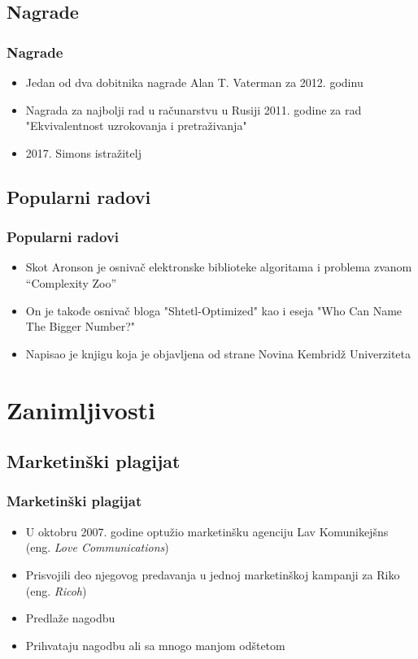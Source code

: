 \documentclass{beamer}
\begin{document}
\subsection{Nagrade}
\begin{frame}[fragile]\frametitle{Nagrade}
	\begin{itemize}	
		\item Jedan od dva dobitnika nagrade Alan T. Vaterman za 2012. godinu
		\item Nagrada za najbolji rad u računarstvu u Rusiji 2011. godine za rad "Ekvivalentnost uzrokovanja i pretraživanja"
		\item 2017. Simons istražitelj
	\end{itemize}
\end{frame}

\subsection{Popularni radovi}
\begin{frame}[fragile]\frametitle{Popularni radovi}
	\begin{itemize}	
		\item Skot Aronson je osnivač elektronske biblioteke algoritama i problema zvanom ``Complexity Zoo''
		\item On je takođe osnivač bloga "Shtetl-Optimized" kao i eseja "Who Can Name The Bigger Number?"
		\item Napisao je knjigu koja je objavljena od strane Novina Kembridž Univerziteta
	\end{itemize}
\end{frame}


\section{Zanimljivosti}
\subsection{Marketinški plagijat}
\begin{frame}[fragile]\frametitle{Marketinški plagijat}
	\begin{itemize}
		\item<2-> U oktobru 2007. godine optužio marketinšku agenciju Lav Komunikejšns (eng. \textit{Love Communications})
		\item<2-> Prisvojili deo njegovog predavanja u jednoj marketinškoj kampanji za Riko (eng. \textit{Ricoh})
		\item<3-> Predlaže nagodbu
		\item<4-> Prihvataju nagodbu ali sa mnogo manjom odštetom
	\end{itemize}
\end{frame}
\end{document}
